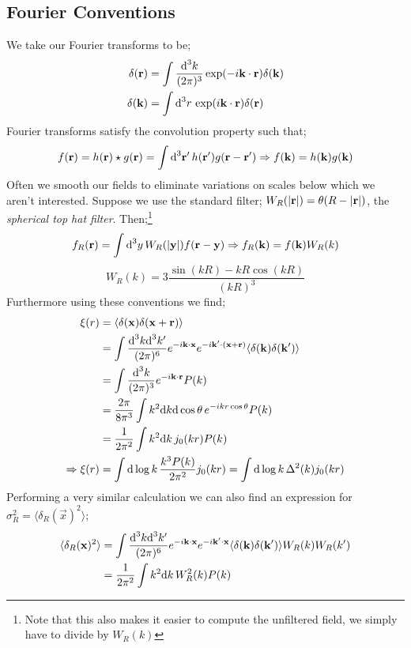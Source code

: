 \subsection{Fourier Conventions}
We take our Fourier transforms to be;
\begin{align}
\delta(\mathbf r) &= \int{\frac{\text{d}^3 k}{(2\pi)^3} \exp(-i\mathbf{k}\cdot\mathbf{r})\delta(\mathbf k)} \\
\delta(\mathbf k) &= \int{\text{d}^3 r \, \exp(i\mathbf{k}\cdot\mathbf{r})\delta(\mathbf r)}
\end{align}
Fourier transforms satisfy the convolution property such that;
\begin{equation}
f(\mathbf r) = h(\mathbf r) \star g(\mathbf r) = \int{\text{d}^3 \mathbf{r}^{\prime}\, h(\mathbf{r}^{\prime})g(\mathbf{r} - \mathbf{r}^{\prime})} \Rightarrow f(\mathbf k) = h(\mathbf k)g(\mathbf k)
\end{equation}
Often we smooth our fields to eliminate variations on scales below which we aren't interested. Suppose we use the standard filter; $W_R(\abs{\vec r}) = \theta\left(R - \abs{\vec r}\right)$, the \emph{spherical top hat filter}. Then;\footnote{Note that this also makes it easier to compute the unfiltered field, we simply have to divide by $W_R(k)$}
\begin{equation*}
f_R(\vec r) = \int{\upd{^3 y} W_R(\abs{\vec y})f(\vec r - \vec y)} \Rightarrow f_R(\vec k) = f(\vec k) W_R(k)
\end{equation*}
\begin{equation*}
W_R(k) = 3 \frac{\sin(kR) - kR \cos(kR)}{(kR)^3}
\end{equation*}
Furthermore using these conventions we find;
\begin{align*}
\xi(r) &= \langle \delta(\mathbf x) \delta(\mathbf x + \mathbf r) \rangle \\
&= \int{\frac{\text{d}^3 k \text{d}^3 k^{\prime}}{(2\pi)^6}e^{-i\mathbf{k}\cdot\mathbf{x}}e^{-i\mathbf{k}^{\prime}\cdot (\mathbf x + \mathbf r)}\langle \delta(\mathbf k)\delta(\mathbf{k}^{\prime}) \rangle} \\
&= \int{\frac{\text{d}^3 k}{(2\pi)^3}e^{-i\mathbf{k}\cdot\mathbf{r}}P(k)} \\
&=\frac{2\pi}{8\pi^3}\int{k^2\text{d}k \text{d}\cos \theta \, e^{-ikr\cos \theta} P(k)} \\
&=\frac{1}{2\pi^2}\int{k^2 \text{d}k \, j_0(kr) P(k)} \\
\Rightarrow \xi(r) &= \int{\text{d}\log k \, \frac{k^3 P(k)}{2\pi^2}j_0(kr)} = \int{\text{d}\log k \, \Delta^2(k) j_0(kr)}
\end{align*}
Performing a very similar calculation we can also find an expression for $\sigma_R^2 = \langle \delta_R(\vec x)^2 \rangle$;
\begin{align*}
\langle \delta_R(\mathbf x)^2 \rangle &= \int{\frac{\text{d}^3 k \text{d}^3 k^{\prime}}{(2\pi)^6}e^{-i\mathbf{k}\cdot\mathbf{x}}e^{-i\mathbf{k}^{\prime}\cdot\mathbf{x}}\langle \delta(\mathbf{k})\delta(\mathbf{k}^{\prime}) \rangle W_R(k) W_R(k^{\prime})} \\
&= \frac{1}{2\pi^2}\int{k^2 \text{d}k \, W^2_R(k)P(k)}
\end{align*}

